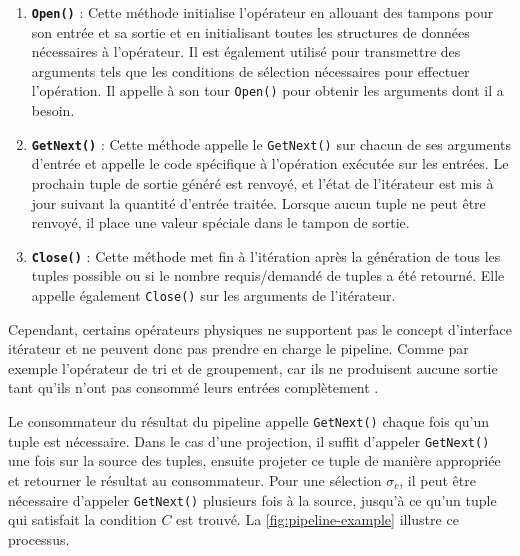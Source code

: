 \begin{enumerate}
 \item \textbf{\texttt{Open()}} : Cette méthode initialise l'opérateur en allouant des tampons pour son entrée et sa sortie et en initialisant toutes les structures de données nécessaires à l'opérateur. Il est également utilisé pour transmettre des arguments tels que les conditions de sélection nécessaires pour effectuer l'opération. Il appelle à son tour \texttt{Open()} pour obtenir les arguments dont il a besoin.
 \item \textbf{\texttt{GetNext()}} : Cette méthode appelle le \texttt{GetNext()} sur chacun de ses arguments d'entrée et appelle le code spécifique à l'opération exécutée sur les entrées. Le prochain tuple de sortie généré est renvoyé, et l'état de l'itérateur est mis à jour suivant la quantité d'entrée traitée. Lorsque aucun tuple ne peut être renvoyé, il place une valeur spéciale dans le tampon de sortie.
 \item \textbf{\texttt{Close()}} : Cette méthode met fin à l'itération après la génération de tous les tuples possible ou si le nombre requis/demandé de tuples a été retourné. Elle appelle également \texttt{Close()} sur les arguments de l'itérateur.
\end{enumerate}

Cependant, certains opérateurs physiques ne supportent pas le concept d'interface itérateur et ne peuvent donc pas prendre en charge le pipeline. Comme par exemple l'opérateur de tri et de groupement, car ils ne produisent aucune sortie tant qu'ils n'ont pas consommé leurs entrées complètement \cite{luo04}.

\begin{example}
 Le consommateur du résultat du pipeline appelle \texttt{GetNext()} chaque fois qu'un tuple est nécessaire. Dans le cas d'une projection, il suffit d'appeler \texttt{GetNext()} une fois sur la source des tuples, ensuite projeter ce tuple de manière appropriée et retourner le résultat au consommateur. Pour une sélection $\sigma_c$, il peut être nécessaire d'appeler \texttt{GetNext()} plusieurs fois à la source, jusqu'à ce qu'un tuple qui satisfait la condition $C$ est trouvé. La \ref{fig:pipeline-example} illustre ce processus.
\end{example}

